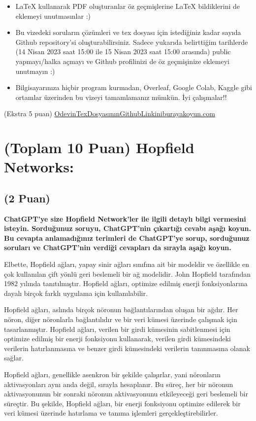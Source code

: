 \documentclass[11pt]{article}
\begin{document}
\begin{itemize}
    \item LaTeX kullanarak PDF oluşturanlar öz geçmişlerine LaTeX bildiklerini de eklemeyi unutmasınlar :)
    \item Bu vizedeki soruların çözümleri ve tex dosyası için istediğiniz kadar sayıda Github repository'si oluşturabilirsiniz. Sadece yukarıda belirttiğim tarihlerde (14 Nisan 2023 saat 15:00 ile 15 Nisan 2023 saat 15:00 arasında) public yapmayı/halka açmayı ve Github profilinizi de öz geçmişinize eklemeyi unutmayın :)
    \item Bilgisayarınıza hiçbir program kurmadan, Overleaf, Google Colab, Kaggle gibi ortamlar üzerinden bu vizeyi tamamlamanız mümkün. İyi çalışmalar!!
\end{itemize}

(Ekstra 5 puan) \url{OdevinTexDosyasınınGithubLinkiniburayakoyun.com}

\newpage
\section{(Toplam 10 Puan) Hopfield Networks:}

\subsection{(2 Puan)} \textbf{ChatGPT’ye size Hopfield Network’ler ile ilgili detaylı bilgi vermesini isteyin. Sorduğunuz soruyu, ChatGPT'nin çıkartığı cevabı aşağı koyun. Bu cevapta anlamadığınız terimleri de ChatGPT’ye sorup, sorduğunuz soruları ve ChatGPT’nin verdiği cevapları da sırayla aşağı koyun.}

Elbette, Hopfield ağları, yapay sinir ağları sınıfına ait bir modeldir ve özellikle en çok kullanılan çift yönlü geri beslemeli bir ağ modelidir. John Hopfield tarafından 1982 yılında tanıtılmıştır. Hopfield ağları, optimize edilmiş enerji fonksiyonlarına dayalı birçok farklı uygulama için kullanılabilir. 

Hopfield ağları, aslında birçok nöronun bağlantılarından oluşan bir ağdır. Her nöron, diğer nöronlarla bağlantılıdır ve bir veri kümesi üzerinde çalışmak için tasarlanmıştır. Hopfield ağları, verilen bir girdi kümesinin sabitlenmesi için optimize edilmiş bir enerji fonksiyonu kullanarak, verilen girdi kümesindeki verilerin hatırlanmasına ve benzer girdi kümesindeki verilerin tanınmasına olanak sağlar. 

Hopfield ağları, genellikle asenkron bir şekilde çalışırlar, yani nöronların aktivasyonları aynı anda değil, sırayla hesaplanır. Bu süreç, her bir nöronun aktivasyonunun bir sonraki nöronun aktivasyonunu etkileyeceği geri beslemeli bir süreçtir. Bu şekilde, Hopfield ağları, bir enerji fonksiyonu optimize edilerek bir veri kümesi üzerinde hatırlama ve tanıma işlemleri gerçekleştirebilirler. 
\end{document}
